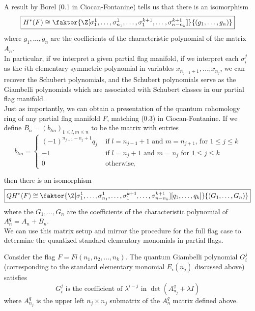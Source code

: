 \documentclass[11pt]{article}
\begin{document}
A result by Borel (0.1 in Ciocan-Fontanine) tells us that there is an isomorphism 
\[
    \boxed{H^*(F) \cong \faktor{\Z[\sigma_1^1, \dots, \sigma_{n_1}^1, \dots, \sigma_1^{k+1}, \dots, \sigma_{n-n_k}^{k+1}]}{(g_1, \dots, g_n)}}
\]
where $g_1, \dots, g_n$ are the coefficients of the characteristic polynomial of the matrix $A_n$. \\

In particular, if we interpret a given partial flag manifold, if we interpret each $\sigma_i^j$ as the $i$th elementary symmetric polynomial in variables $x_{n_{j-1} + 1}, \dots, x_{n_j}$, we can recover the Schubert polynomials, and the Schubert polynomials serve as the Giambelli polynomials which are associated with Schubert classes in our partial flag manifold. \\

Just as importantly, we can obtain a  presentation of the quantum cohomology ring of any partial flag manifold $F$, matching (0.3) in Ciocan-Fontanine. If we define $B_n = (b_{lm})_{1 \leq l, m \leq n}$ to be the matrix with entries
\[
b_{lm} = \begin{cases}
    (-1)^{n_{j+1} - n_j + 1} q_j & \text{ if $l = n_{j-1} + 1$ and $m = n_{j+1}$, for $1 \leq j \leq k$} \\
    -1 & \text{ if $l = n_{j} + 1$ and $m = n_{j}$ for $1 \leq j \leq k$} \\
    0 & \text{ otherwise},
\end{cases}
\]

then there is an isomorphism
\[
    \boxed{QH^*(F) \cong \faktor{\Z[\sigma_1^1, \dots, \sigma_{n_1}^1, \dots, \sigma_1^{k+1}, \dots, \sigma_{n-n_k}^{k+1}][q_1, \dots, q_k]}{(G_1, \dots, G_n)}}
\]
where the $G_1, \dots, G_n$ are the coefficients of the characteristic polynomial of $A_n^q = A_n + B_n$. \\

We can use this matrix setup and mirror the procedure for the full flag case to determine the quantized standard elementary monomials in partial flags. 

\begin{theorem}
Consider the flag $F = Fl(n_1, n_2, \dots, n_k)$. The quantum Giambelli polynomial $G_i^j$ (corresponding to the standard elementary monomial $E_i(n_j)$ discussed above) satisfies
\[
    G_{i}^j \text{ is the coefficient of } \lambda^{i-j} \text{ in } \det (A_{n_j}^q + \lambda I)
\] 
where $A_{n_j}^q$ is the upper left $n_j \times n_j$ submatrix of the $A_n^q$ matrix defined above.
\end{theorem}
\end{document}
